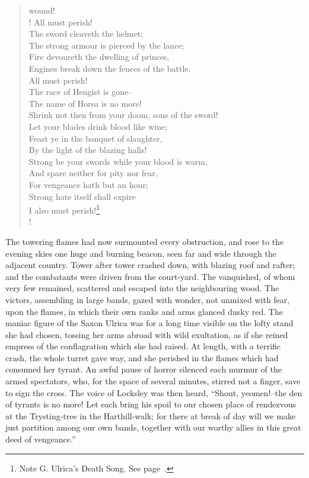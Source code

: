 \begin{verse}
wound!\\!
All must perish!\\
The sword cleaveth the helmet;\\
The strong armour is pierced by the lance;\\
Fire devoureth the dwelling of princes,\\
Engines break down the fences of the battle.\\
All must perish!\\
The race of Hengist is gone--\\
The name of Horsa is no more!\\
Shrink not then from your doom, sons of the sword!\\
Let your blades drink blood like wine;\\
Feast ye in the banquet of slaughter,\\
By the light of the blazing halls!\\
Strong be your swords while your blood is warm,\\
And spare neither for pity nor fear,\\
For vengeance hath but an hour;\\
Strong hate itself shall expire\\
I also must perish!\footnote{Note G. Ulrica's Death Song. See
page~\pageref{noteCXXXI}.}\\!
\end{verse}

The towering flames had now surmounted every obstruction, and rose to
the evening skies one huge and burning beacon, seen far and wide through
the adjacent country. Tower after tower crashed down, with blazing roof
and rafter; and the combatants were driven from the court-yard. The
vanquished, of whom very few remained, scattered and escaped into the
neighbouring wood. The victors, assembling in large bands, gazed with
wonder, not unmixed with fear, upon the flames, in which their own ranks
and arms glanced dusky red. The maniac figure of the Saxon Ulrica was
for a long time visible on the lofty stand she had chosen, tossing her
arms abroad with wild exultation, as if she reined empress of the
conflagration which she had raised. At length, with a terrific crash,
the whole turret gave way, and she perished in the flames which had
consumed her tyrant. An awful pause of horror silenced each murmur of
the armed spectators, who, for the space of several minutes, stirred not
a finger, save to sign the cross. The voice of Locksley was then heard,
``Shout, yeomen!--the den of tyrants is no more! Let each bring his
spoil to our chosen place of rendezvous at the Trysting-tree in the
Harthill-walk; for there at break of day will we make just partition
among our own bands, together with our worthy allies in this great deed
of vengeance.''
